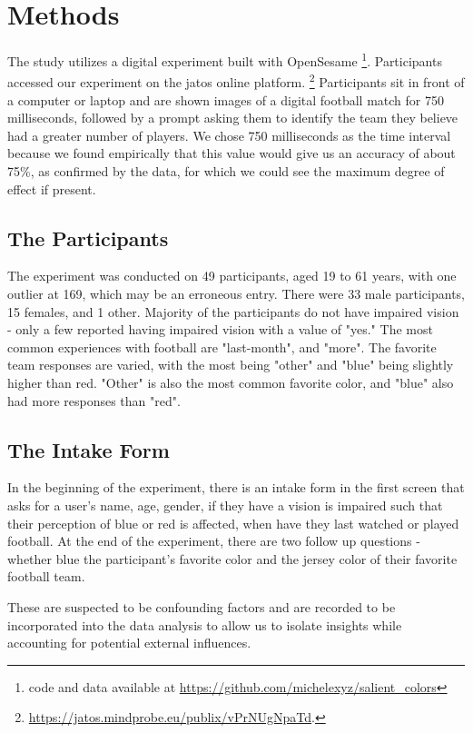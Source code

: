 \section{Methods}\label{s:design}

The study utilizes a digital experiment built with OpenSesame \footnote{code and data available at \url{https://github.com/michelexyz/salient_colors}}. Participants accessed our experiment on the jatos online platform. \footnote{\url{https://jatos.mindprobe.eu/publix/vPrNUgNpaTd}.} Participants sit in front of a computer or laptop and are shown images of a digital football match for 750 milliseconds, followed by a prompt asking them to identify the team they believe had a greater number of players. We chose 750 milliseconds as the time interval because we found empirically that this value would give us an accuracy of about 75\%, as confirmed by the data, for which we could see the maximum degree of effect if present.

\subsection{The Participants}
The experiment was conducted on 49 participants, aged 19 to 61 years, with one outlier at 169, which may be an erroneous entry. There were 33 male participants, 15 females, and 1 other. Majority of the participants do not have impaired vision - only a few reported having impaired vision with a value of "yes." The most common experiences with football are "last-month", and "more". The favorite team responses are varied, with the most being "other" and "blue" being slightly higher than red. "Other" is also the most common favorite color, and "blue" also had more responses than "red".

\subsection{The Intake Form}

In the beginning of the experiment, there is an intake form in the first screen that asks for a user's name, age, gender, if they have a vision is impaired such that their perception of blue or red is affected, when  have they last watched or played football. At the end of the experiment, there are two follow up questions - whether blue the participant's favorite color and the jersey color of their favorite football team. 

These are suspected to be confounding factors and are recorded to be incorporated into the data analysis to allow us to isolate insights while accounting for potential external influences.


